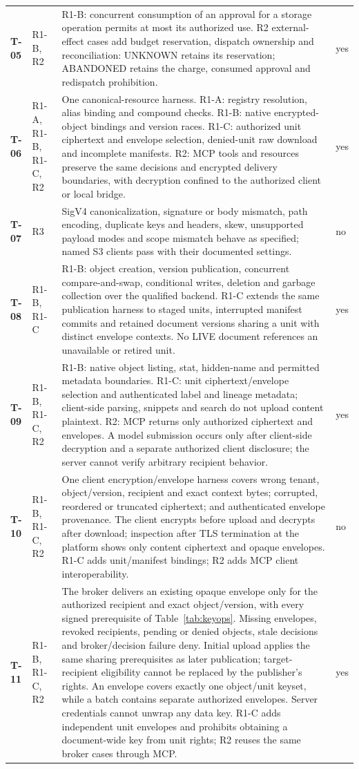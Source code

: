 \documentclass[11pt,a4paper]{article}
\newcommand{\testrow}[4]{\hypertarget{test:#1}{\textbf{#1}} & #2 & #3 & #4\\}
\begin{document}
\begin{longtable}{@{}P{0.06\textwidth}P{0.09\textwidth}P{0.68\textwidth}P{0.09\textwidth}@{}}
\testrow{T-05}{R1-B, R2}{R1-B: concurrent consumption of an approval for a storage operation permits at most its authorized use. R2 external-effect cases add budget reservation, dispatch ownership and reconciliation: UNKNOWN retains its reservation; ABANDONED retains the charge, consumed approval and redispatch prohibition.}{yes}
\testrow{T-06}{R1-A, R1-B, R1-C, R2}{One canonical-resource harness. R1-A: registry resolution, alias binding and compound checks. R1-B: native encrypted-object bindings and version races. R1-C: authorized unit ciphertext and envelope selection, denied-unit raw download and incomplete manifests. R2: MCP tools and resources preserve the same decisions and encrypted delivery boundaries, with decryption confined to the authorized client or local bridge.}{yes}
\testrow{T-07}{R3}{SigV4 canonicalization, signature or body mismatch, path encoding, duplicate keys and headers, skew, unsupported payload modes and scope mismatch behave as specified; named S3 clients pass with their documented settings.}{no}
\testrow{T-08}{R1-B, R1-C}{R1-B: object creation, version publication, concurrent compare-and-swap, conditional writes, deletion and garbage collection over the qualified backend. R1-C extends the same publication harness to staged units, interrupted manifest commits and retained document versions sharing a unit with distinct envelope contexts. No LIVE document references an unavailable or retired unit.}{yes}
\testrow{T-09}{R1-B, R1-C, R2}{R1-B: native object listing, stat, hidden-name and permitted metadata boundaries. R1-C: unit ciphertext/envelope selection and authenticated label and lineage metadata; client-side parsing, snippets and search do not upload content plaintext. R2: MCP returns only authorized ciphertext and envelopes. A model submission occurs only after client-side decryption and a separate authorized client disclosure; the server cannot verify arbitrary recipient behavior.}{yes}
\testrow{T-10}{R1-B, R1-C, R2}{One client encryption/envelope harness covers wrong tenant, object/version, recipient and exact context bytes; corrupted, reordered or truncated ciphertext; and authenticated envelope provenance. The client encrypts before upload and decrypts after download; inspection after TLS termination at the platform shows only content ciphertext and opaque envelopes. R1-C adds unit/manifest bindings; R2 adds MCP client interoperability.}{no}
\testrow{T-11}{R1-B, R1-C, R2}{The broker delivers an existing opaque envelope only for the authorized recipient and exact object/version, with every signed prerequisite of Table~\ref{tab:keyops}. Missing envelopes, revoked recipients, pending or denied objects, stale decisions and broker/decision failure deny. Initial upload applies the same sharing prerequisites as later publication; target-recipient eligibility cannot be replaced by the publisher's rights. An envelope covers exactly one object/unit keyset, while a batch contains separate authorized envelopes. Server credentials cannot unwrap any data key. R1-C adds independent unit envelopes and prohibits obtaining a document-wide key from unit rights; R2 reuses the same broker cases through MCP.}{yes}

\end{longtable}
\end{document}
